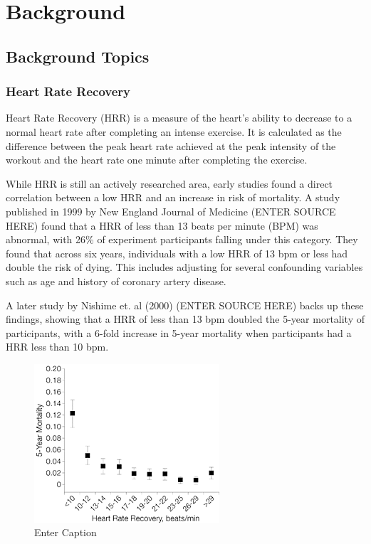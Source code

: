 \documentclass{l4proj}
\begin{document}
\chapter{Background}

\section{Background Topics}

\subsection{Heart Rate Recovery}

Heart Rate Recovery (HRR) is a measure of the heart’s ability to decrease to a normal heart rate after completing an intense exercise. It is calculated as the difference between the peak heart rate achieved at the peak intensity of the workout and the heart rate one minute after completing the exercise. 

While HRR is still an actively researched area, early studies found a direct correlation between a low HRR and an increase in risk of mortality. A study published in 1999 by New England Journal of Medicine (ENTER SOURCE HERE) found that a HRR of less than 13 beats per minute (BPM) was abnormal, with 26\% of experiment participants falling under this category. They found that across six years, individuals with a low HRR of 13 bpm or less had double the risk of dying. This includes adjusting for several confounding variables such as age and history of coronary artery disease.

A later study by Nishime et. al (2000) (ENTER SOURCE HERE) backs up these findings, showing that a HRR of less than 13 bpm doubled the 5-year mortality of participants, with a 6-fold increase in 5-year mortality when participants had a HRR less than 10 bpm.

\begin{figure}[h!]
    \centering
    \includegraphics[width=0.5\linewidth]{dissertation//dissImages/BackgroundHRR.png}
    \caption{Enter Caption}
    \label{fig:enter-label}
\end{figure}
\end{document}
